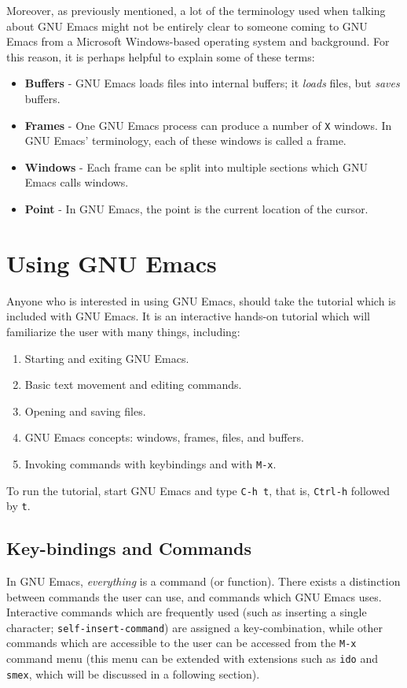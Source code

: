 \documentclass[12pt,a4paper,oneside]{article}
\begin{document}
Moreover, as previously mentioned, a lot of the terminology used when talking about GNU Emacs might not be entirely clear to someone coming to GNU Emacs from a Microsoft Windows-based operating system and background. For this reason, it is perhaps helpful to explain some of these terms:\\

\begin{itemize}
  \item \textbf{Buffers} - GNU Emacs loads files into internal buffers; it \emph{loads} files, but \emph{saves} buffers.
  \item \textbf{Frames} - One GNU Emacs process can produce a number of \texttt{X} windows. In GNU Emacs' terminology, each of these windows is called a frame.
  \item \textbf{Windows} - Each frame can be split into multiple sections which GNU Emacs calls windows.
  \item \textbf{Point} - In GNU Emacs, the point is the current location of the cursor.
\end{itemize}

\section{Using GNU Emacs}
Anyone who is interested in using GNU Emacs, should take the tutorial which is included with GNU Emacs. It is an interactive hands-on tutorial which will familiarize the user with many things, including:

\begin{enumerate}
  \item Starting and exiting GNU Emacs.
  \item Basic text movement and editing commands.
  \item Opening and saving files.
  \item GNU Emacs concepts: windows, frames, files, and buffers.
  \item Invoking commands with keybindings and with \texttt{M-x}.
\end{enumerate}

To run the tutorial, start GNU Emacs and type \texttt{C-h t}, that is, \texttt{Ctrl-h} followed by \texttt{t}.

\subsection{Key-bindings and Commands}
In GNU Emacs, \emph{everything} is a command (or function). There exists a distinction between commands the user can use, and commands which GNU Emacs uses. Interactive commands which are frequently used (such as inserting a single character; \texttt{self-insert-command}) are assigned a key-combination, while other commands which are accessible to the user can be accessed from the \texttt{M-x} command menu (this menu can be extended with extensions such as \texttt{ido} and \texttt{smex}, which will be discussed in a following section).\\
\end{document}
